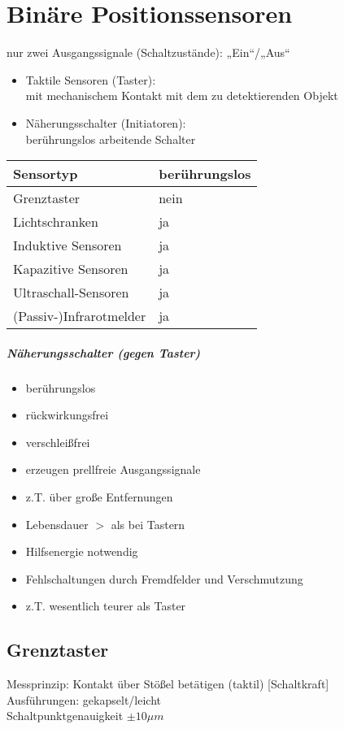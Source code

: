 \chapter{Binäre Positionssensoren}
nur zwei Ausgangssignale (Schaltzustände): „Ein“/„Aus“
\begin{itemize}
\item Taktile Sensoren (Taster):\\
mit mechanischem Kontakt mit dem zu detektierenden Objekt
\item Näherungsschalter (Initiatoren):\\
berührungslos arbeitende Schalter
\end{itemize}
\begin{tabular}{l | l}
Sensortyp & berührungslos\\\hline
Grenztaster & nein \\
Lichtschranken & ja \\
Induktive Sensoren & ja\\
Kapazitive Sensoren & ja\\
Ultraschall-Sensoren & ja\\
(Passiv-)Infrarotmelder & ja
\end{tabular}

\paragraph{Näherungsschalter (gegen Taster)}
\begin{itemize}[label=$+$]
\item berührungslos
\item rückwirkungsfrei
\item verschleißfrei
\item erzeugen prellfreie Ausgangssignale
\item z.T. über große Entfernungen
\item Lebensdauer $>$ als bei Tastern
\end{itemize}
\begin{itemize}[label=$-$]
\item Hilfsenergie notwendig
\item Fehlschaltungen durch Fremdfelder und Verschmutzung
\item z.T. wesentlich teurer als Taster
\end{itemize}

\section{Grenztaster}
Messprinzip: Kontakt über Stößel betätigen (taktil) [Schaltkraft]\\
Ausführungen: gekapselt/leicht\\
Schaltpunktgenauigkeit $\pm 10 \unit{\mu m}$
